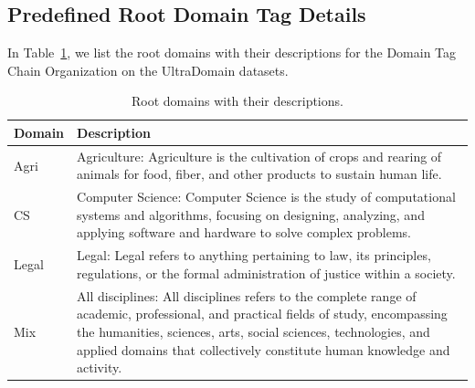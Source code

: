 \documentclass[11pt]{article}
\begin{document}
\subsection{Predefined Root Domain Tag Details}
In Table~\ref{tab:root domains}, we list the root domains with their descriptions for the Domain Tag Chain Organization on the UltraDomain datasets.


\begin{table}[h]
\centering
\begin{tabularx}{0.48\textwidth}{p{1.1cm}|X}
\toprule
Domain & Description \\ \midrule
Agri & Agriculture: Agriculture is the cultivation of crops and rearing of animals for food, fiber, and other products to sustain human life. \\
CS & Computer Science: Computer Science is the study of computational systems and algorithms, focusing on designing, analyzing, and applying software and hardware to solve complex problems. \\
Legal & Legal: Legal refers to anything pertaining to law, its principles, regulations, or the formal administration of justice within a society. \\
Mix & All disciplines: All disciplines refers to the complete range of academic, professional, and  practical fields of study, encompassing the humanities, sciences, arts, social sciences, technologies, and applied domains that collectively constitute human knowledge and activity. \\
\bottomrule
\end{tabularx}
\caption{Root domains with their descriptions.}
\label{tab:root domains}
\end{table}

\end{document}
